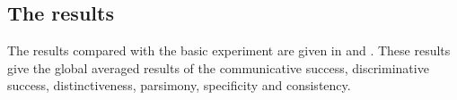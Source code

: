 \subsection{The results}

The results compared with the basic experiment are given in  and . These results give the global averaged results of the communicative success, discriminative success, distinctiveness, parsimony, specificity and consistency.

\begin{figure}
\centering
{}
\\
\\

\end{figure}
